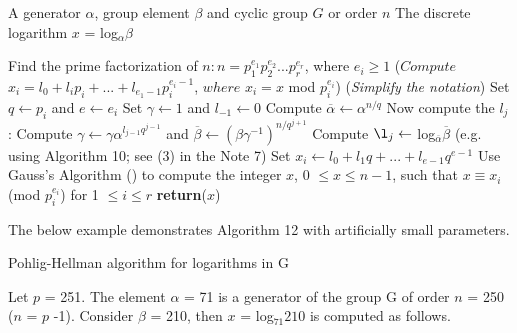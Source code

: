 \documentclass[iwp,first]{luthesis}
\begin{document}
\begin{algorithm}
\caption{Pohlig-Hellman algorithm for computing discrete logarithms}
\begin{algorithmic}
\REQUIRE A generator $\alpha$, group element $\beta$ and cyclic group $G$ or order $n$
\ENSURE The discrete logarithm $x$ = log$_{\alpha}\beta$
\begin{enumerate}
\STATE Find the prime factorization of $n: n = p_{1}^{e_1}p_{2}^{e_2}...p_{r}^{e_r}$, where $e_i \geq 1$
\STATE ($Compute$ $x_i = l_0 + l_{i}p_{i} +...+l_{{e_1}-1}p_i^{{e_i}-1}$, $where$ $x_i = x$ mod $p_i^{e_i}$)
 (\textit{Simplify the notation}) Set $q \leftarrow p_i$ and $e \leftarrow e_i$
 Set $\gamma \leftarrow 1$ and $l_{-1} \leftarrow 0$
 Compute $\overline{\alpha} \leftarrow \alpha^{n/q}$
 Now compute the $l_j$:
\STATE Compute $\gamma \leftarrow \gamma\alpha^{l_{j-1}q^{j-1}}$ and $\overline{\beta} \leftarrow (\beta\gamma^{-1})^{n/{q^{j+1}}}$
\STATE Compute $\l_j \leftarrow$ log$_{\overline{\alpha}}\overline{\beta}$ (e.g. using Algorithm 10; see (3) in the Note 7)
\ENDFOR
{} Set $x_i \leftarrow l_0 + l_{1}q +...+ l_{e-1}q^{e-1}$
\ENDFOR
\STATE Use Gauss's Algorithm () to compute the integer $x$, 0 $\leq x \leq n - 1$, such that $x \equiv x_i$ (mod $p_i^{e_i}$) for 1 $\leq i \leq r$
\STATE \textbf{return}($x$)
\end{enumerate}
\end{algorithmic}
\end{algorithm}

The below example demonstrates Algorithm 12 with artificially small parameters.

\begin{example}{Pohlig-Hellman algorithm for logarithms in G}
\end{example}

Let $p$ = 251. The element $\alpha$ = 71 is a generator of the group G of order $n$ = 250 ($n$ = $p$ -1). Consider $\beta$ = 210, then $x$ = log$_{71}210$ is computed as follows.
\end{document}
